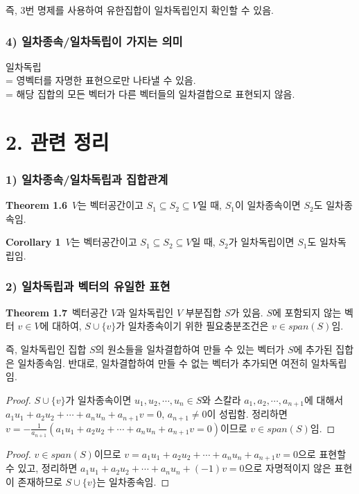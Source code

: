 \documentclass[10pt, a4paper]{article}
\begin{document}
즉, 3번 명제를 사용하여 유한집합이 일차독립인지 확인할 수 있음.


\subsubsection*{4) 일차종속/일차독립이 가지는 의미}
일차독립\\
= 영벡터를 자명한 표현으로만 나타낼 수 있음.\\ 
= 해당 집합의 모든 벡터가 다른 벡터들의 일차결합으로 표현되지 않음.\\


\newpage


\section*{2. 관련 정리}
\subsubsection*{1) 일차종속/일차독립과 집합관계}

\textbf{Theorem 1.6}\, $V$는 벡터공간이고 $S_1 \subseteq S_2 \subseteq V$일 때, $S_1$이 일차종속이면 $S_2$도 일차종속임.

\textbf{Corollary 1}\, $V$는 벡터공간이고 $S_1 \subseteq S_2 \subseteq V$일 때, $S_2$가 일차독립이면 $S_1$도 일차독립임.

\subsubsection*{2) 일차독립과 벡터의 유일한 표현}

\textbf{Theorem 1.7}\, 벡터공간 $V$과 일차독립인 $V$ 부분집합 $S$가 있음. $S$에 포함되지 않는 벡터 $v \in V$에 대하여, $S \cup \{v\}$가 일차종속이기 위한 필요충분조건은 $v \in span(S)$임.

즉, 일차독립인 집합 $S$의 원소들을 일차결합하여 만들 수 있는 벡터가 $S$에 추가된 집합은 일차종속임. 반대로, 일차결합하여 만들 수 없는 벡터가 추가되면 여전히 일차독립임.

\begin{proof}
$S \cup \{ v \}$가 일차종속이면 $u_1,u_2, \cdots ,u_n \in S$와 스칼라 $a_1,a_2, \cdots ,a_{n+1}$에 대해서 $a_1u_1+a_2u_2+ \cdots +a_nu_n+a_{n+1}v=0$, $a_{n+1} \not= 0$이 성립함. 정리하면 $v = - \frac{1}{a_{n+1}}(a_1u_1+a_2u_2+ \cdots +a_nu_n+a_{n+1}v=0)$이므로 $v \in span(S)$임.
\end{proof}

\begin{proof}
$v \in span(S)$이므로 $v = a_1u_1+a_2u_2+ \cdots +a_nu_n+a_{n+1}v=0$으로 표현할 수 있고, 정리하면 $a_1u_1+a_2u_2+ \cdots +a_nu_n+(-1)v=0$으로 자명적이지 않은 표현이 존재하므로 $S \cup \{ v \}$는 일차종속임.
\end{proof}
\end{document}
